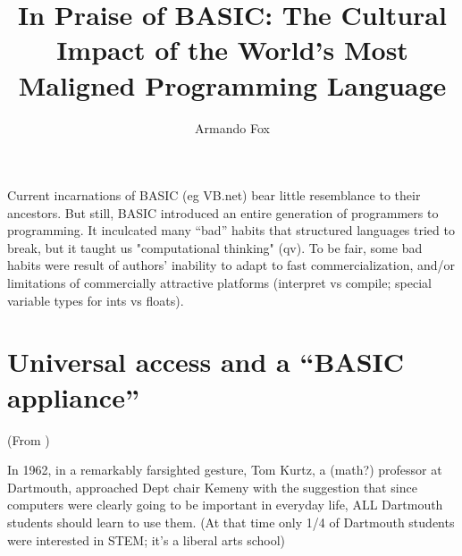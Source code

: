 \documentclass{article}
\title{In Praise of BASIC: The Cultural Impact of the World's Most
  Maligned Programming Language}
\author{Armando Fox}
\begin{document}
\maketitle





Current incarnations of BASIC (eg VB.net) bear little resemblance to
their ancestors.  But still, BASIC introduced an entire generation of
programmers to programming.  It inculcated many ``bad'' habits that
structured languages tried to break, but it taught us "computational
thinking" (qv).  To be fair, some bad habits were result of authors'
inability to adapt to fast commercialization, and/or limitations of
commercially attractive platforms (interpret vs compile; special
variable types for ints vs floats).

\section{Universal access and a ``BASIC appliance''}

(From \cite{goto})

In 1962, in a remarkably farsighted gesture, Tom Kurtz, a (math?)
professor at Dartmouth, approached Dept chair Kemeny with the suggestion
that since computers were clearly going to be important in everyday
life, ALL Dartmouth students should learn to use them.  (At that time
only 1/4 of Dartmouth students were interested in STEM; it's a liberal
arts school)
\end{document}
